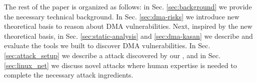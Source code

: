 

The rest of the paper is organized as follows:
in Sec. \ref{sec:background} we provide the necessary technical background. 
In Sec. \ref{sec:dma-risks} we introduce new theoretical basis to reason about DMA vulnerabilities.
Next, inspired by the new theoretical basis, in Sec. \ref{sec:static-analysis} and \ref{sec:dma-kasan} we describe and evaluate the tools we built to discover DMA vulnerabilities. 
In Sec. \ref{sec:attack_setup} we describe a \simple attack discovered by our \tool, and in Sec. \ref{sec:linux_net} we discuss novel \compound attacks where human expertise is needed to complete the necessary attack ingredients.


